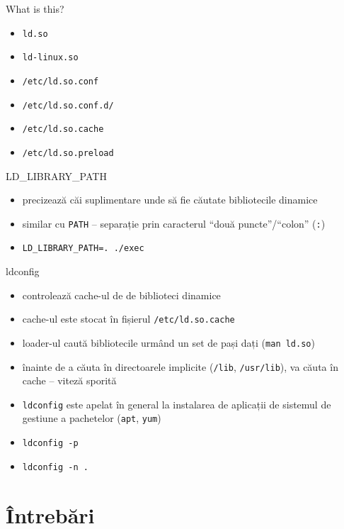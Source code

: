 \documentclass{beamer}
\begin{document}
\begin{frame}{What is this?}
  \begin{itemize}
    \item \texttt{ld.so}
    \item \texttt{ld-linux.so}
    \item \texttt{/etc/ld.so.conf}
    \item \texttt{/etc/ld.so.conf.d/}
    \item \texttt{/etc/ld.so.cache}
    \item \texttt{/etc/ld.so.preload}
  \end{itemize}
\end{frame}

\begin{frame}{LD\_LIBRARY\_PATH}
  \begin{itemize}
    \item precizează căi suplimentare unde să fie căutate bibliotecile
    dinamice
    \item similar cu \texttt{PATH} -- separație prin caracterul ``două
    puncte''/``colon'' (\texttt{:})
    \item \texttt{LD\_LIBRARY\_PATH=. ./exec}
  \end{itemize}
\end{frame}

\begin{frame}{ldconfig}
  \begin{itemize}
    \item controlează cache-ul de de biblioteci dinamice
    \item cache-ul este stocat în fișierul \texttt{/etc/ld.so.cache}
    \item loader-ul caută bibliotecile urmând un set de pași dați (\texttt{man
    ld.so})
    \item înainte de a căuta în directoarele implicite (\texttt{/lib},
    \texttt{/usr/lib}), va căuta în cache -- viteză sporită
    \item \texttt{ldconfig} este apelat în general la instalarea de aplicații
    de sistemul de gestiune a pachetelor (\texttt{apt}, \texttt{yum})
    \item \texttt{ldconfig -p}
    \item \texttt{ldconfig -n .}
  \end{itemize}
\end{frame}

\section{Întrebări}
\end{document}
